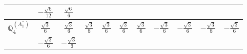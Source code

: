 \documentclass[fleqn,10pt,landscape]{article}
\begin{document}
\begin{itemize}
{\begin{center}
\begin{longtable}{ccccccccccc}
& $ - \frac{\sqrt{6}}{12} $ & $ \frac{\sqrt{6}}{6} $ & $  $ & $  $ & $  $ & $  $ & $  $ & $  $ & $  $ & $  $ \\ \hline
$\mathbb{Q}_{4}^{(A_{1}^{\prime\prime})}$ & $ \frac{\sqrt{3}}{6} $ & $ \frac{\sqrt{3}}{6} $ & $ \frac{\sqrt{3}}{6} $ & $ \frac{\sqrt{3}}{6} $ & $ \frac{\sqrt{3}}{6} $ & $ \frac{\sqrt{3}}{6} $ & $ - \frac{\sqrt{3}}{6} $ & $ - \frac{\sqrt{3}}{6} $ & $ - \frac{\sqrt{3}}{6} $ & $ - \frac{\sqrt{3}}{6} $ \\
& $ - \frac{\sqrt{3}}{6} $ & $ - \frac{\sqrt{3}}{6} $ & $  $ & $  $ & $  $ & $  $ & $  $ & $  $ & $  $ & $  $ \\
\end{longtable}
\end{center}
}
\end{itemize}
\end{document}
